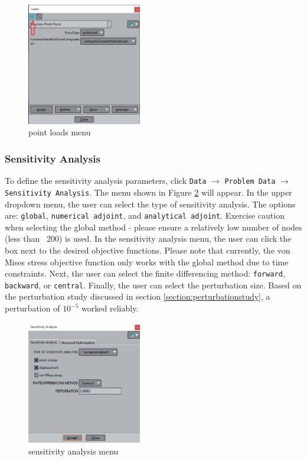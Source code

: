 \begin{figure}[ht]
  \centering
  \includegraphics[width=50mm]{images/GiD_loads_point.png}
  \caption{point loads menu}
  \label{fig:GiDLoadsPoint}
\end{figure}
\subsubsection{Sensitivity Analysis}
To define the sensitivity analysis parameters, click \texttt{Data} $\rightarrow$ \texttt{Problem Data} $\rightarrow$ \texttt{Sensitivity Analysis}. The menu shown in Figure \ref{fig:GiDSensAnalMenu} will appear. In the upper dropdown menu, the user can select the type of sensitivity analysis. The options are: \texttt{global}, \texttt{numerical adjoint}, and \texttt{analytical adjoint}. Exercise caution when selecting the global method - please ensure a relatively low number of nodes (less than ~200) is used. In the sensitivity analysis menu, the user can click the box next to the desired objective functions. Please note that currently, the von Mises stress objective function only works with the global method due to time constraints. Next, the user can select the finite differencing method: \texttt{forward}, \texttt{backward}, or \texttt{central}. Finally, the user can select the perturbation size. Based on the perturbation study discussed in section \ref{section:perturbationstudy}, a perturbation of $10^{-5}$ worked reliably.
\begin{figure}[ht]
  \centering
  \includegraphics[width=50mm]{images/GiD_sens_analysis.png}
  \caption{sensitivity analysis menu}
  \label{fig:GiDSensAnalMenu}
\end{figure}

